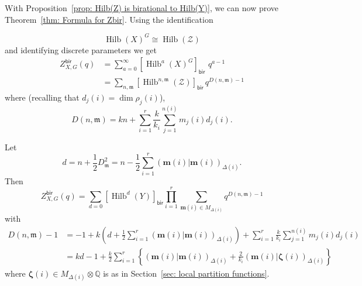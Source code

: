 \documentclass{amsart}
\theoremstyle{definition}
\newcommand{\half}{\frac{1}{2}}
\newcommand{\QQ} {{\mathbb Q}}		%
\newcommand{\bir}{\mathsf{bir}}
\newcommand{\mdata}{\mathfrak{m}}
\newcommand{\Zcal}{\mathcal{Z}}
\newcommand{\mvec}{\bm{m}}
\newcommand{\zetavec}{\bm{\zeta }}
\newcommand{\Hilb}{\operatorname{Hilb}}
\begin{document}
With Proposition~\ref{prop: Hilb(Z) is birational to Hilb(Y)}, we can
now prove Theorem~\ref{thm: Formula for Zbir}.  Using the
identification

\[
\Hilb(X)^{G} \cong  \Hilb (\Zcal )
\]
and identifying
discrete parameters we get
\begin{align*}
Z^{\bir}_{X,G}(q)& = \sum_{a=0}^{\infty} \left[\Hilb^{a}(X)^{G}
\right]_{\bir} \, \, q^{a-1} \\
& = \sum_{n,\mdata} \left[\Hilb^{n,\mdata}(\Zcal ) \right]_{\bir } \,  q^{D(n,\mdata )-1}
\end{align*}
where (recalling that $d_{j}(i) =\dim \rho_{j}(i)$),
\[
D(n,\mdata ) = kn +\sum_{i=1}^{r}\frac{k}{k_{i}}\sum_{j=1}^{n(i)}
m_{j}(i) d_{j}(i).
\]


\begin{comment}
We can organize the data $\mdata = \left\{m_{j}(i) \right\}$ into
$\mvec (i)\in M_{\Delta (i)}$, i.e.  the vectors in the root lattice
of $\Delta (i)$ having components $ m_{1}(i),\dotsc
,m_{n(i)}(i)$. Under this identification, we see that
\[
D_{\mdata}^{2} = -\sum_{i=1}^{r} \left(\mvec (i)|\mvec (i)
\right)_{\Delta (i)} 
\]
since the intersection form of the exceptional curves over $p_{i}$ is
the negative of the corresponding Cartan matrix $C_{\Delta (i)}$. 
\end{comment}
Let
\[
d=n+\half D_{\mdata}^{2} = n-\half \sum_{i=1}^{r} \left(\mvec (i)|\mvec (i)
\right)_{\Delta (i)} .
\]
Then
\[
Z^{\bir}_{X,G}(q) = \sum_{d=0}\left[\Hilb^{d}(Y) \right]_{\bir}
\prod_{i=1}^{r}\sum_{\mvec (i)\in M_{\Delta (i)}} q^{D(n,\mdata )-1} 
\]
with
\begin{align*}
D(n,\mdata )-1& = -1 + k\left(d+\half \sum_{i=1}^{r} \left(\mvec (i)|\mvec (i)
\right)_{\Delta (i)}  \right)
+\sum_{i=1}^{r}\frac{k}{k_{i}}\sum_{j=1}^{n(i)} m_{j}(i) d_{j}(i) \\
&=kd-1 +\frac{k}{2}\sum_{i=1}^{r} \left\{  \left(\mvec (i)|\mvec (i)
\right)_{\Delta (i)} +\frac{2}{k_{i}}  \left(\mvec (i)|\zetavec (i)
\right)_{\Delta (i)} \right\}
\end{align*}
where $\zetavec (i) \in M_{\Delta (i)}\otimes \QQ $ is as in
Section~\ref{sec: local partition functions}. 
\end{document}
